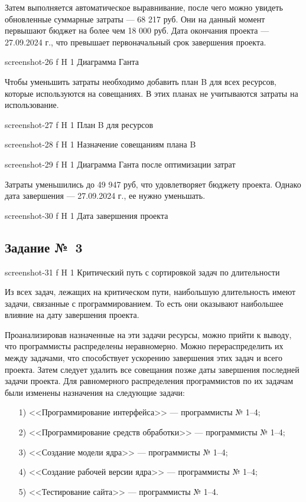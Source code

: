 \documentclass{bmstu}
\begin{document}
Затем выполняется автоматическое выравнивание, после чего можно увидеть обновленные суммарные затраты --- 68 217 руб. 
Они на данный момент первышают бюджет на более чем 18 000 руб. 
Дата окончания проекта --- 27.09.2024 г., что превышает первоначальный срок завершения проекта.
    
    {screenshot-26}
    {f}
    {H}
    {1\textwidth}
    {Диаграмма Ганта}
    
Чтобы уменьшить затраты необходимо добавить план B для всех ресурсов, которые используются на совещаниях. 
В этих планах не учитываются затраты на использование.
    
    {screenshot-27}
    {f}
    {H}
    {1\textwidth}
    {План B для ресурсов}
    
    {screenshot-28}
    {f}
    {H}
    {1\textwidth}
    {Назначение совещаниям плана B}
    
    {screenshot-29}
    {f}
    {H}
    {1\textwidth}
    {Диаграмма Ганта после оптимизации затрат}
    
Затраты уменьшились до 49 947 руб, что удовлетворяет бюджету проекта. 
Однако дата завершения --- 27.09.2024 г., ее нужно уменьшать.
    
    {screenshot-30}
    {f}
    {H}
    {1\textwidth}
    {Дата завершения проекта}

\subsection{Задание №~3}

    {screenshot-31}
    {f}
    {H}
    {1\textwidth}
    {Критический путь с сортировкой задач по длительности}

Из всех задач, лежащих на критическом пути, наибольшую длительность имеют задачи, связанные с программированием. 
То есть они оказывают наибольшее влияние на дату завершения проекта.

Проанализировав назначенные на эти задачи ресурсы, можно прийти к выводу, что программисты распределены неравномерно. 
Можно перераспределить их между задачами, что способствует ускорению завершения этих задач и всего проекта. 
Затем следует удалить все совещания позже даты завершения последней задачи проекта. 
Для равномерного распределения программистов по их задачам были изменены назначения на следующие задачи:
\begin{enumerate}
\item[1)] <<Программирование интерфейса>> --- программисты № 1--4;
\item[2)] <<Программирование средств обработки>> --- программисты № 1--4;
\item[3)] <<Создание модели ядра>> --- программисты № 1--4;
\item[4)] <<Создание рабочей версии ядра>> --- программисты № 1--4;
\item[5)] <<Тестирование сайта>> --- программисты № 1--4.
\end{enumerate}
\end{document}
